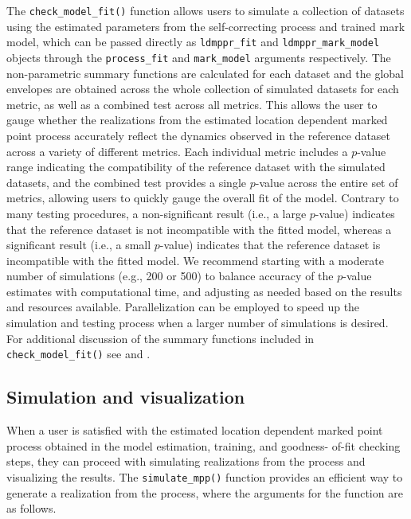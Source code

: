{The \texttt{check\_model\_fit()} function allows users to simulate a collection
of datasets using the estimated parameters from the self-correcting
process and trained mark model, which can be passed directly as \texttt{ldmppr\_fit} and \texttt{ldmppr\_mark\_model} objects through the \texttt{process\_fit} and \texttt{mark\_model} arguments respectively. The non-parametric summary functions are
calculated for each dataset and the global envelopes are obtained across
the whole collection of simulated datasets for each metric, as well as a
combined test across all metrics. This allows the user to gauge whether
the realizations from the estimated location dependent marked point
process accurately reflect the dynamics observed in the reference
dataset across a variety of different metrics. Each individual metric
includes a \(p\)-value range indicating the compatibility of the reference
dataset with the simulated datasets, and the combined test provides a
single \(p\)-value across the entire set of metrics, allowing users to
quickly gauge the overall fit of the model. Contrary to many testing procedures, a non-significant result (i.e., a large \(p\)-value) indicates that the reference dataset is not incompatible with the fitted model, whereas a significant result (i.e., a small \(p\)-value) indicates that the reference dataset is incompatible with the fitted model. We recommend starting with a moderate number of simulations (e.g., 200 or 500) to balance accuracy of the \(p\)-value estimates with computational time, and adjusting as needed based on the results and resources available. Parallelization can be employed to speed up the simulation and testing process when a larger number of simulations is desired.
For additional discussion of the summary functions included in \texttt{check\_model\_fit()} see \citet{mollerStatisticalInferenceSimulation2003} and
\citet{schlatherDetectingDependenceMarks2004}.}

\subsection{Simulation and visualization}\label{simulation-and-visualization}

When a user is satisfied with the estimated location dependent marked
point process obtained in the model estimation, training, and goodness-
of-fit checking steps, they can proceed with simulating realizations
from the process and visualizing the results. The \texttt{simulate\_mpp()}
function provides an efficient way to generate a realization from the
process, where the arguments for the function are as follows.


